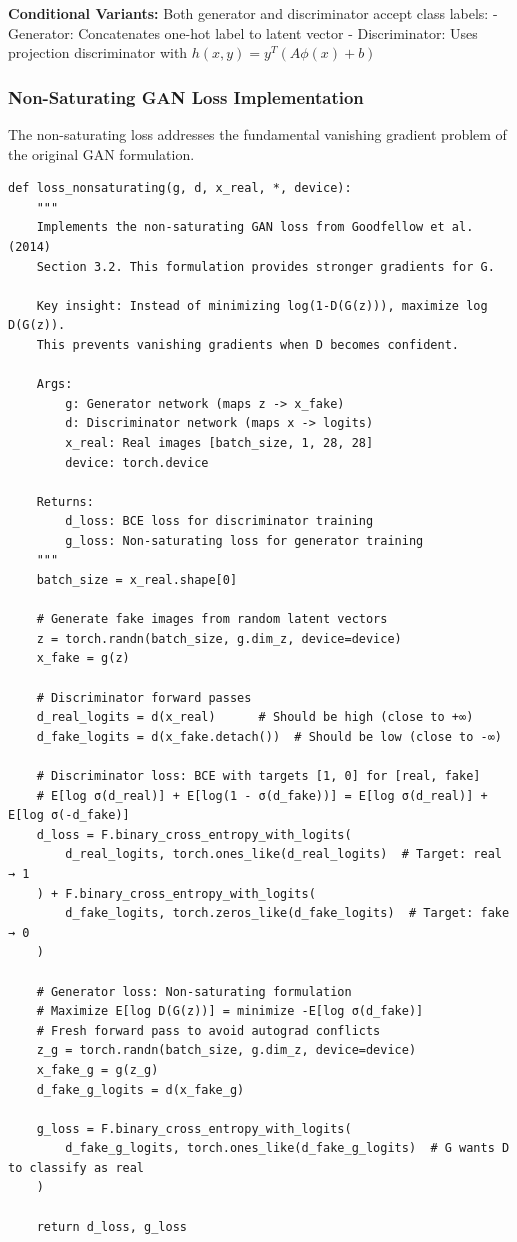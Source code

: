 \documentclass{article}
\begin{document}
\textbf{Conditional Variants:} Both generator and discriminator accept class labels:
- Generator: Concatenates one-hot label to latent vector
- Discriminator: Uses projection discriminator with $h(x,y) = y^T (A\phi(x) + b)$

\subsubsection{Non-Saturating GAN Loss Implementation}

The non-saturating loss addresses the fundamental vanishing gradient problem of the original GAN formulation.

\begin{verbatim}
def loss_nonsaturating(g, d, x_real, *, device):
    """
    Implements the non-saturating GAN loss from Goodfellow et al. (2014)
    Section 3.2. This formulation provides stronger gradients for G.

    Key insight: Instead of minimizing log(1-D(G(z))), maximize log D(G(z)).
    This prevents vanishing gradients when D becomes confident.

    Args:
        g: Generator network (maps z -> x_fake)
        d: Discriminator network (maps x -> logits)
        x_real: Real images [batch_size, 1, 28, 28]
        device: torch.device

    Returns:
        d_loss: BCE loss for discriminator training
        g_loss: Non-saturating loss for generator training
    """
    batch_size = x_real.shape[0]

    # Generate fake images from random latent vectors
    z = torch.randn(batch_size, g.dim_z, device=device)
    x_fake = g(z)

    # Discriminator forward passes
    d_real_logits = d(x_real)      # Should be high (close to +∞)
    d_fake_logits = d(x_fake.detach())  # Should be low (close to -∞)

    # Discriminator loss: BCE with targets [1, 0] for [real, fake]
    # E[log σ(d_real)] + E[log(1 - σ(d_fake))] = E[log σ(d_real)] + E[log σ(-d_fake)]
    d_loss = F.binary_cross_entropy_with_logits(
        d_real_logits, torch.ones_like(d_real_logits)  # Target: real → 1
    ) + F.binary_cross_entropy_with_logits(
        d_fake_logits, torch.zeros_like(d_fake_logits)  # Target: fake → 0
    )

    # Generator loss: Non-saturating formulation
    # Maximize E[log D(G(z))] = minimize -E[log σ(d_fake)]
    # Fresh forward pass to avoid autograd conflicts
    z_g = torch.randn(batch_size, g.dim_z, device=device)
    x_fake_g = g(z_g)
    d_fake_g_logits = d(x_fake_g)

    g_loss = F.binary_cross_entropy_with_logits(
        d_fake_g_logits, torch.ones_like(d_fake_g_logits)  # G wants D to classify as real
    )

    return d_loss, g_loss
\end{verbatim}
\end{document}
